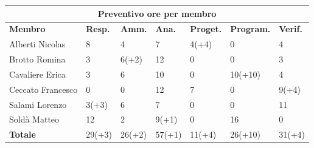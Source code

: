 \documentclass[a4paper, 12pt]{article}
\begin{document}
\begin{center}
	\begin{tabularx}{\textwidth}{|X|X|X|X|X|X|X|}
		\hline
		\multicolumn{7}{|c|}{\textbf{Preventivo ore per membro}}                                            \\
		\hline
		\hline
		\textbf{Membro}   & \textbf{Resp.}    & \textbf{Amm.}   & \textbf{Ana.} &
		\textbf{Proget.}  & \textbf{Program.} & \textbf{Verif.}                                             \\
		\hline
		Alberti Nicolas   & 8                 & 4               & 7             & 4(+4)  & 0       & 4      \\
		\hline
		Brotto Romina     & 3                 & 6(+2)           & 12            & 0      & 0       & 3      \\
		\hline
		Cavaliere Erica   & 3                 & 6               & 10            & 0      & 10(+10) & 4      \\
		\hline
		Ceccato Francesco & 0                 & 0               & 12            & 7      & 0       & 9(+4)  \\
		\hline
		Salami Lorenzo    & 3(+3)             & 6               & 7             & 0      & 0       & 11     \\
		\hline
		Soldà Matteo      & 12                & 2               & 9(+1)         & 0      & 16      & 0      \\
		\hline
		\hline
		\textbf{Totale}   & 29(+3)            & 26(+2)          & 57(+1)        & 11(+4) & 26(+10) & 31(+4) \\
		\hline
	\end{tabularx}\\[8pt]
	\mbox{}\\
\end{center}

\newpage
\end{document}
